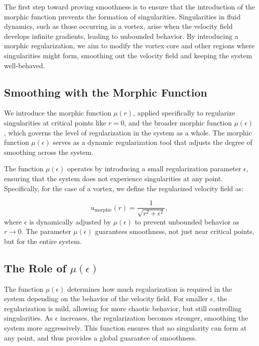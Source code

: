 \documentclass{article}
\begin{document}
The first step toward proving smoothness is to ensure that the introduction of the morphic function prevents the formation of singularities. Singularities in fluid dynamics, such as those occurring in a vortex, arise when the velocity field develops infinite gradients, leading to unbounded behavior. By introducing a morphic regularization, we aim to modify the vortex core and other regions where singularities might form, smoothing out the velocity field and keeping the system well-behaved.

\subsection*{Smoothing with the Morphic Function}

We introduce the morphic function \( \mu(r) \), applied specifically to regularize singularities at critical points like \( r = 0 \), and the broader morphic function \( \mu(\epsilon) \), which governs the level of regularization in the system as a whole. The morphic function \( \mu(\epsilon) \) serves as a dynamic regularization tool that adjusts the degree of smoothing across the system.

The function \( \mu(\epsilon) \) operates by introducing a small regularization parameter \( \epsilon \), ensuring that the system does not experience singularities at any point. Specifically, for the case of a vortex, we define the regularized velocity field as:

\[
u_{\text{morphic}}(r) = \frac{1}{\sqrt{r^2 + \epsilon^2}},
\]
where \( \epsilon \) is dynamically adjusted by \( \mu(\epsilon) \) to prevent unbounded behavior as \( r \to 0 \). The parameter \( \mu(\epsilon) \) guarantees smoothness, not just near critical points, but for the entire system.

\subsection*{The Role of \( \mu(\epsilon) \)}

The function \( \mu(\epsilon) \) determines how much regularization is required in the system depending on the behavior of the velocity field. For smaller \( \epsilon \), the regularization is mild, allowing for more chaotic behavior, but still controlling singularities. As \( \epsilon \) increases, the regularization becomes stronger, smoothing the system more aggressively. This function ensures that no singularity can form at any point, and thus provides a global guarantee of smoothness.
\end{document}
